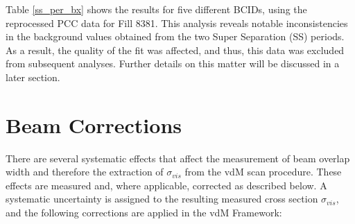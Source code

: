 Table  \ref{ss_per_bx} shows the results for five different BCIDs, using the reprocessed PCC data for Fill 8381. This analysis reveals notable inconsistencies in the background values obtained from the two Super Separation (SS) periods. As a result, the quality of the fit was affected, and thus, this data was excluded from subsequent analyses. Further details on this matter will be discussed in a later section.

\section{Beam Corrections}

There are several systematic effects that affect the measurement of beam overlap width and therefore the extraction of $\sigma_{vis}$ from the vdM scan procedure. These effects are measured and, where applicable, corrected as described below. A systematic uncertainty is assigned to the resulting measured cross section $\sigma_{vis}$, and the following corrections are applied in the vdM Framework:
 
